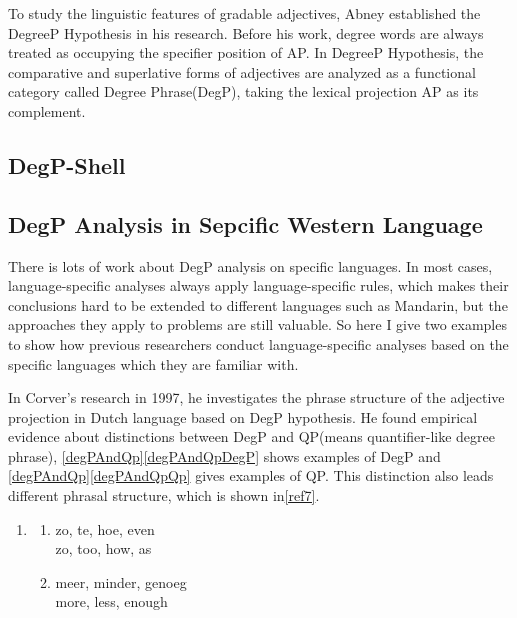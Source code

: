 \documentclass{ctexart}
\let \cite \parencite
\begin{document}

To study the linguistic features of gradable adjectives, Abney established the DegreeP Hypothesis in his research\cite{abney1987}. Before his work, degree words are always treated as occupying the specifier position of AP\cite{bowers1975,jackendoff1977}. In DegreeP Hypothesis, the comparative and superlative forms of adjectives are analyzed as a functional category called Degree Phrase(DegP), taking the lexical projection AP as its complement.

\subsection{DegP-Shell}


\subsection{DegP Analysis in Sepcific Western Language}

There is lots of work about DegP analysis on specific languages. In most cases, language-specific analyses always apply language-specific rules, which makes their conclusions hard to be extended to different languages such as Mandarin, but the approaches they apply to problems are still valuable. So here I give two examples to show how previous researchers conduct language-specific analyses based on the specific languages which they are familiar with.

In Corver's research in 1997, he investigates the phrase structure of the adjective projection in Dutch language \cite{corver1997a} based on DegP hypothesis. He found empirical evidence about distinctions between DegP and QP(means quantifier-like degree phrase), \ref{degPAndQp}\ref{degPAndQpDegP} shows examples of DegP and \ref{degPAndQp}\ref{degPAndQpQp} gives examples of QP. This distinction also leads different phrasal structure, which is shown in\ref{ref7}. 

\begin{enumerate}[resume]
\item \label{degPAndQp}
\begin{enumerate}
\item \label{degPAndQpDegP} 
zo, te, hoe, even \\
zo, too, how, as
\item \label{degPAndQpQp}
meer, minder, genoeg \\
more, less, enough
\end{enumerate}
\end{enumerate}
\end{document}
